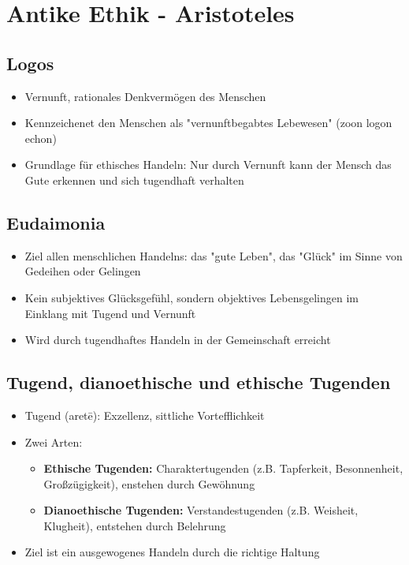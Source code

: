 
\section{Antike Ethik - Aristoteles}

\subsection{Logos}
\begin{itemize}
    \item Vernunft, rationales Denkvermögen des Menschen
    \item Kennzeichenet den Menschen als "vernunftbegabtes Lebewesen" (zoon logon echon)
    \item Grundlage für ethisches Handeln: Nur durch Vernunft kann der Mensch das Gute erkennen und sich tugendhaft verhalten
\end{itemize}

\subsection{Eudaimonia}
\begin{itemize}
    \item Ziel allen menschlichen Handelns: das "gute Leben", das "Glück" im Sinne von Gedeihen oder Gelingen
    \item Kein subjektives Glücksgefühl, sondern objektives Lebensgelingen im Einklang mit Tugend und Vernunft
    \item Wird durch tugendhaftes Handeln in der Gemeinschaft erreicht
\end{itemize}

\subsection{Tugend, dianoethische und ethische Tugenden}
\begin{itemize}
    \item Tugend (aretē): Exzellenz, sittliche Vortefflichkeit
    \item Zwei Arten:
    \begin{itemize}
        \item \textbf{Ethische Tugenden:} Charaktertugenden (z.B. Tapferkeit, Besonnenheit, Großzügigkeit), enstehen durch Gewöhnung
        \item \textbf{Dianoethische Tugenden:} Verstandestugenden (z.B. Weisheit, Klugheit), entstehen durch Belehrung
    \end{itemize}
    \item Ziel ist ein ausgewogenes Handeln durch die richtige Haltung
\end{itemize}

